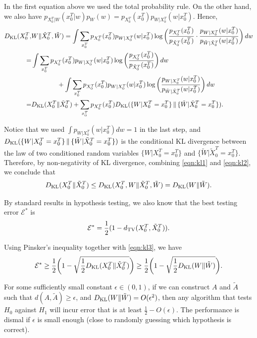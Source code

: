 \documentclass[a4paper, 11pt]{article}
\newcommand{\dkl}{D_{\textnormal{KL}}}
\newcommand{\dtv}{d_{\textnormal{TV}}}
\begin{document}
In the first equation above we used the total probability rule. On the other hand, we also have $p_{X_0^T|W}(x_0^T|w) p_W(w)=p_{X_0^T}(x_0^T) p_{W|X_0^T}(w|x_0^T)$. Hence,
\begin{align}
\label{eqn:kl2}
\dkl(X_0^T, & W\|\tilde{X}_0^T, \tilde{W})
= \int \sum_{x_0^T} p_{X_0^T}(x_0^T) p_{W|X_0^T}(w|x_0^T)\log\bigg(\frac{p_{X_0^T}(x_0^T)}{p_{\tilde{X}_0^T}(x_0^T)}\cdot \frac{p_{W|X_0^T}(w|x_0^T)}{p_{\tilde{W}|\tilde{X}_0^T}(w|x_0^T)}\bigg)\,dw \nonumber\\
=& \int \sum_{x_0^T} p_{X_0^T}(x_0^T) p_{W|X_0^T}(w|x_0^T)\log\bigg(\frac{p_{X_0^T}(x_0^T)}{p_{\tilde{X}_0^T}(x_0^T)}\bigg)\,dw \nonumber\\
&\qquad\qquad + \int \sum_{x_0^T} p_{X_0^T}(x_0^T) p_{W|X_0^T}(w|x_0^T)\log\bigg(\frac{p_{W|X_0^T}(w|x_0^T)}{p_{\tilde{W}|\tilde{X}_0^T}(w|x_0^T)}\bigg)\,dw \nonumber\\
=& \dkl(X_0^T\|\tilde{X}_0^T)+\sum_{x_0^T}p_{X_0^T}(x_0^T)\dkl(\{W|X_0^T=x_0^T\}\,\|\,\{\tilde{W}|\tilde{X}_0^T=x_0^T\}).
\end{align}

Notice that we used $\int p_{W|X_0^T}(w|x_0^T)dw=1$ in the last step, and $\dkl(\{W|X_0^T=x_0^T\}\,\|\,\{\tilde{W}|\tilde{X}_0^T=x_0^T\})$ is the conditional KL divergence between the law of two conditioned random variables $\{W|X_0^T=x_0^T\}$ and $\{\tilde{W}|\tilde{X}_0^T=x_0^T\}$. Therefore, by non-negativity of KL divergence, combining \cref{eqn:kl1} and \cref{eqn:kl2}, we conclude that 
\[\dkl(X_0^T\|\tilde{X}_0^T)\leq \dkl(X_0^T, W\|\tilde{X}_0^T, \tilde{W}) = \dkl(W\|\tilde{W}).\label{eqn:kl3}\]

By standard results in hypothesis testing, we also know that the best testing error $\mathcal{E}^*$ is 
\[\mathcal{E}^*=\frac{1}{2}(1-\dtv(X_0^T, \tilde{X}_0^T)).\]

Using Pinsker's inequality together with \cref{eqn:kl3}, we have
\[\mathcal{E}^*\geq \frac{1}{2}\bigg(1-\sqrt{\frac{1}{2}\dkl(X_0^T\|\tilde{X}_0^T)}\bigg)\geq \frac{1}{2}\bigg(1-\sqrt{\frac{1}{2}\dkl(W\|\tilde{W})}\bigg).\]

For some sufficiently small constant $\epsilon\in(0,1)$, if we can construct $A$ and $\tilde{A}$ such that $d(A,\tilde{A})\geq \epsilon$, and $\dkl(W\|\tilde{W})= O(\epsilon^2)$, then any algorithm that tests $H_0$ against $H_1$ will incur error that is at least $\frac{1}{2}-O(\epsilon)$. The performance is dismal if $\epsilon$ is small enough (close to randomly guessing which hypothesis is correct). 
\end{document}
